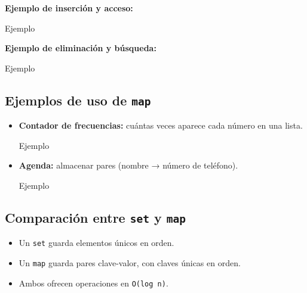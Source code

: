\documentclass{article}
\newcommand{\cppfile}[2][]{
    \begin{container}{\faCode \space \space  #1}
        
    \end{container}
}
\begin{document}
\textbf{Ejemplo de inserción y acceso:}

\cppfile[Ejemplo]{codes/map2.cpp}

\textbf{Ejemplo de eliminación y búsqueda:}

\cppfile[Ejemplo]{codes/map3.cpp}

\vspace{1.5cm}

\subsection{Ejemplos de uso de \texttt{map}}

\begin{itemize}
    \item \textbf{Contador de frecuencias:} cuántas veces aparece cada número en una lista.
    \cppfile[Ejemplo]{codes/map_ejemplo1.cpp}

    \item \textbf{Agenda:} almacenar pares (nombre → número de teléfono).
    \cppfile[Ejemplo]{codes/map_ejemplo2.cpp}
\end{itemize}

\vspace{1.5cm}

\subsection{Comparación entre \texttt{set} y \texttt{map}}

\begin{itemize}
    \item Un \texttt{set} guarda elementos únicos en orden.
    \item Un \texttt{map} guarda pares clave-valor, con claves únicas en orden.
    \item Ambos ofrecen operaciones en \texttt{O(log n)}.
\end{itemize}
\end{document}
